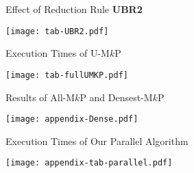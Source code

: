 \documentclass[sigconf, nonacm]{acmart}
\begin{document}
\begin{table*}
  \caption{Effect of Reduction Rule \textbf{UBR2}}\label{tab-UBR2}
  \texttt{[image: tab-UBR2.pdf]}
\end{table*}

\begin{table*}
  \caption{Execution Times of U-M$k$P}\label{tab-fullUMKP}
  \texttt{[image: tab-fullUMKP.pdf]}
\end{table*}

\begin{table*}
  \caption{Results of All-M$k$P and Densest-M$k$P}\label{appendix-tab-dense}
  \texttt{[image: appendix-Dense.pdf]}
\end{table*}

\begin{table*}
  \caption{Execution Times of Our Parallel Algorithm}\label{appendix:tab-parallel}
  \texttt{[image: appendix-tab-parallel.pdf]}
\end{table*}
\end{document}
